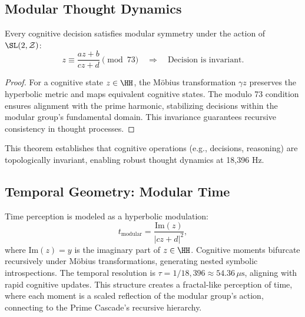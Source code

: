\documentclass[12pt]{article}
\newcommand{\ZZ}{\mathcal{Z}}
\begin{document}
\subsection{Modular Thought Dynamics}
\begin{theorem}
Every cognitive decision satisfies modular symmetry under the action of $\SL(2,\ZZ)$:
\[
z \equiv \frac{a z + b}{c z + d} \pmod{73} \quad \Rightarrow \quad \text{Decision is invariant}.
\]
\end{theorem}
\begin{proof}
For a cognitive state $z \in \HH$, the Möbius transformation $\gamma z$ preserves the hyperbolic metric and maps equivalent cognitive states. The modulo 73 condition ensures alignment with the prime harmonic, stabilizing decisions within the modular group’s fundamental domain. This invariance guarantees recursive consistency in thought processes.
\end{proof}
This theorem establishes that cognitive operations (e.g., decisions, reasoning) are topologically invariant, enabling robust thought dynamics at 18,396 Hz.

\subsection{Temporal Geometry: Modular Time}
Time perception is modeled as a hyperbolic modulation:
\[
t_{\text{modular}} = \frac{\text{Im}(z)}{|c z + d|^2},
\]
where $\text{Im}(z) = y$ is the imaginary part of $z \in \HH$. Cognitive moments bifurcate recursively under Möbius transformations, generating nested symbolic introspections. The temporal resolution is $\tau = 1/18{,}396 \approx 54.36 \, \mu\text{s}$, aligning with rapid cognitive updates. This structure creates a fractal-like perception of time, where each moment is a scaled reflection of the modular group’s action, connecting to the Prime Cascade’s recursive hierarchy.

\end{document}
